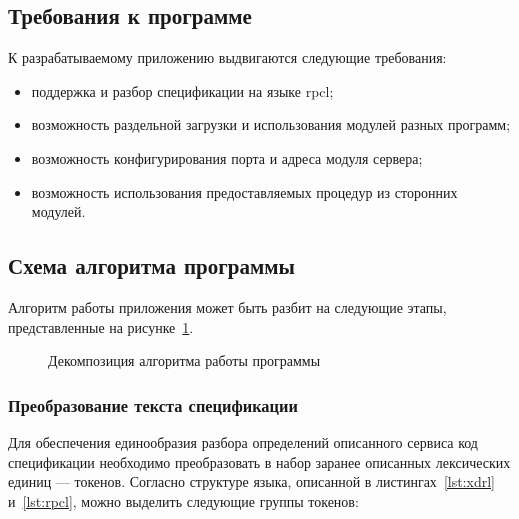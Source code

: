 
\vspace{-1\baselineskip}

\subsection{Требования к программе}

К разрабатываемому приложению выдвигаются следующие требования:
\begin{itemize}
    \item поддержка и разбор спецификации на языке rpcl;
    \item возможность раздельной загрузки и использования модулей разных
          программ;
    \item возможность конфигурирования порта и адреса модуля сервера;
    \item возможность использования предоставляемых процедур из сторонних
          модулей.
\end{itemize}

\subsection{Схема алгоритма программы}

Алгоритм работы приложения может быть разбит на следующие этапы, представленные
на рисунке~\ref{fig:main_alg}.

\begin{figure}[!h]
    \centering
    \def\svgwidth{0.18\textwidth}
    
    \caption{Декомпозиция алгоритма работы программы}
    \label{fig:main_alg}
\end{figure}

\subsubsection{Преобразование текста спецификации}

Для обеспечения единообразия разбора определений описанного сервиса код
спецификации необходимо преобразовать в набор заранее описанных лексических
единиц --- токенов. Согласно структуре языка, описанной в
листингах~\ref{lst:xdrl} и~\ref{lst:rpcl}, можно выделить следующие группы
токенов:

